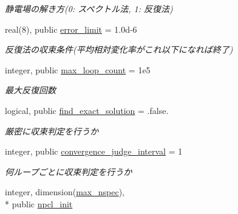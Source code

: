 \begin{DoxyCompactItemize}
\begin{DoxyCompactList}\small\item\em 静電場の解き方(0\-: スペクトル法, 1\-: 反復法) \end{DoxyCompactList}\item 
\hypertarget{classparameters_ad231d6120d312c7a6988c59b617bfe58}{real(8), public \hyperlink{classparameters_ad231d6120d312c7a6988c59b617bfe58}{error\-\_\-limit} = 1.\-0d-\/6}\label{classparameters_ad231d6120d312c7a6988c59b617bfe58}

\begin{DoxyCompactList}\small\item\em 反復法の収束条件(平均相対変化率がこれ以下になれば終了) \end{DoxyCompactList}\item 
\hypertarget{classparameters_a284421460b1e6032c73b649413a85b22}{integer, public \hyperlink{classparameters_a284421460b1e6032c73b649413a85b22}{max\-\_\-loop\-\_\-count} = 1e5}\label{classparameters_a284421460b1e6032c73b649413a85b22}

\begin{DoxyCompactList}\small\item\em 最大反復回数 \end{DoxyCompactList}\item 
\hypertarget{classparameters_a62b8e45eafcecfeda90b0fb00ce5c225}{logical, public \hyperlink{classparameters_a62b8e45eafcecfeda90b0fb00ce5c225}{find\-\_\-exact\-\_\-solution} = .false.}\label{classparameters_a62b8e45eafcecfeda90b0fb00ce5c225}

\begin{DoxyCompactList}\small\item\em 厳密に収束判定を行うか \end{DoxyCompactList}\item 
\hypertarget{classparameters_a6446f66b1d055bef17b59af7e48b3bd6}{integer, public \hyperlink{classparameters_a6446f66b1d055bef17b59af7e48b3bd6}{convergence\-\_\-judge\-\_\-interval} = 1}\label{classparameters_a6446f66b1d055bef17b59af7e48b3bd6}

\begin{DoxyCompactList}\small\item\em 何ループごとに収束判定を行うか \end{DoxyCompactList}\item 
\hypertarget{classparameters_ad77ee2eac1442a04cf861e8d4b50f01b}{integer, dimension(\hyperlink{classparameters_a402ac2b1acba21a0e9487023da144ca0}{max\-\_\-nspec}), \\*
public \hyperlink{classparameters_ad77ee2eac1442a04cf861e8d4b50f01b}{npcl\-\_\-init}}\label{classparameters_ad77ee2eac1442a04cf861e8d4b50f01b}


\end{DoxyCompactItemize}
